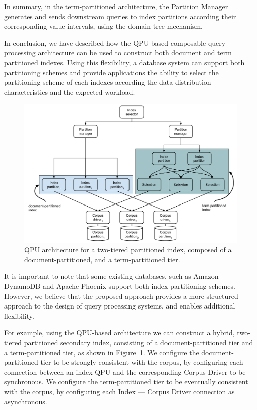 In summary, in the term-partitioned architecture,
the Partition Manager generates and sends downstream queries to index partitions according their corresponding
value intervals, using the domain tree mechanism.

In conclusion, we have described how the QPU-based composable query processing architecture can be used to construct both
document and term partitioned indexes.
Using this flexibility, a database system can support both partitioning schemes and provide applications the ability to
select the partitioning scheme of each indexes according the data distribution characteristics and the expected workload.

\begin{figure}
  \centering
    \includegraphics[width=\textwidth]{./figures/case_studies/index_partitioned_two_level.pdf}
  \caption{QPU architecture for a two-tiered partitioned index, composed of a document-partitioned, and a term-partitioned tier.}
  \label{fig:index_partitioned_two_level}
\end{figure}

It is important to note that some existing databases,
such as Amazon DynamoDB \cite{dynamodb:secondaryindexes} and Apache Phoenix \cite{phoenix:secondaryidnexing}
support both index partitioning schemes.
However, we believe that the proposed approach provides a more structured approach to the design of query processing systems,
and enables additional flexibility.

For example, using the QPU-based architecture we can construct a hybrid, two-tiered partitioned secondary index,
consisting of a document-partitioned tier and a term-partitioned tier, as shown in Figure~\ref{fig:index_partitioned_two_level}.
We configure the document-partitioned tier to be strongly consistent with the corpus,
by configuring each connection between an index QPU and the corresponding Corpus Driver to be synchronous.
We configure the term-partitioned tier to be eventually consistent with the corpus,
by configuring each Index --- Corpus Driver connection as asynchronous.

